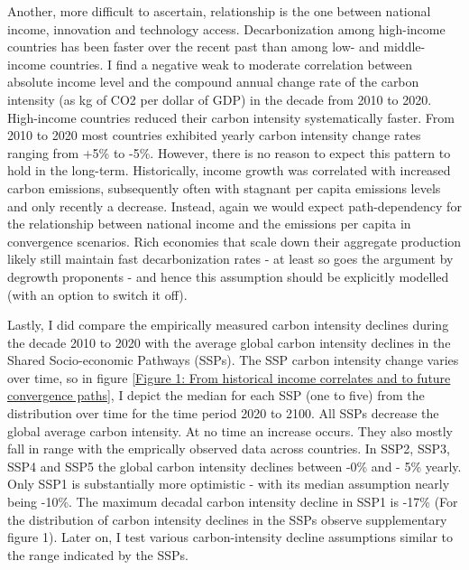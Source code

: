 \documentclass{article}
\begin{document}
Another, more difficult to ascertain, relationship is the one between national income, innovation and technology access. %
Decarbonization among high-income countries has been faster over the recent past than among low- and middle-income countries. I find a negative weak to moderate correlation between absolute income level and the compound annual change rate of the carbon intensity (as kg of CO2 per dollar of GDP) in the decade from 2010 to 2020. High-income countries reduced their carbon intensity systematically faster. From 2010 to 2020 most countries exhibited yearly carbon intensity change rates ranging from +5\% to -5\%. However, there is no reason to expect this pattern to hold in the long-term. Historically, income growth was correlated with increased carbon emissions, subsequently often with stagnant per capita emissions levels and only recently a decrease. Instead, again we would expect path-dependency for the relationship between national income and the emissions per capita in convergence scenarios. Rich economies that scale down their aggregate production likely still maintain fast decarbonization rates - at least so goes the argument by degrowth proponents - and hence this assumption should be explicitly modelled (with an option to switch it off). 

Lastly, I did compare the empirically measured carbon intensity declines during the decade 2010 to 2020 with the average global carbon intensity declines in the Shared Socio-economic Pathways (SSPs). The SSP carbon intensity change varies over time, so in figure \ref{Figure 1: From historical income correlates and to future convergence paths}, I depict the median for each SSP (one to five) from the distribution over time for the time period 2020 to 2100. All SSPs decrease the global average carbon intensity. At no time an increase occurs. They also mostly fall in range with the emprically observed data across countries. In SSP2, SSP3, SSP4 and SSP5 the global carbon intensity declines between -0\% and - 5\% yearly. Only SSP1 is substantially more optimistic - with its median assumption nearly being -10\%. The maximum decadal carbon intensity decline in SSP1 is -17\% (For the distribution of carbon intensity declines in the SSPs observe supplementary figure 1). Later on, I test various carbon-intensity decline assumptions similar to the range indicated by the SSPs.
\end{document}
